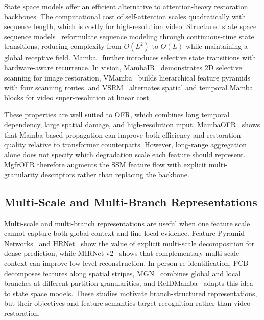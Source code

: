 \documentclass[symmetry,article,submit,pdftex,moreauthors]{Definitions/mdpi}
\begin{document}
State space models offer an efficient alternative to attention-heavy restoration backbones. The computational cost of self-attention scales quadratically with sequence length, which is costly for high-resolution video. Structured state space sequence models~\cite{gu2022s4} reformulate sequence modeling through continuous-time state transitions, reducing complexity from $O(L^2)$ to $O(L)$ while maintaining a global receptive field. Mamba~\cite{gu2024mamba} further introduces selective state transitions with hardware-aware recurrence. In vision, MambaIR~\cite{guo2024mambair} demonstrates 2D selective scanning for image restoration, VMamba~\cite{liu2024vmamba} builds hierarchical feature pyramids with four scanning routes, and VSRM~\cite{tran2025vsrm} alternates spatial and temporal Mamba blocks for video super-resolution at linear cost.

These properties are well suited to OFR, which combines long temporal dependency, large spatial damage, and high-resolution input. MambaOFR~\cite{mao2025mambaofr} shows that Mamba-based propagation can improve both efficiency and restoration quality relative to transformer counterparts. However, long-range aggregation alone does not specify which degradation scale each feature should represent. MgfrOFR therefore augments the SSM feature flow with explicit multi-granularity descriptors rather than replacing the backbone.

\subsection{Multi-Scale and Multi-Branch Representations}
\label{subsec:multigran}

Multi-scale and multi-branch representations are useful when one feature scale cannot capture both global context and fine local evidence. Feature Pyramid Networks~\cite{lin2017fpn} and HRNet~\cite{wang2021hrnet} show the value of explicit multi-scale decomposition for dense prediction, while MIRNet-v2~\cite{zamir2022mirnetv2} shows that complementary multi-scale context can improve low-level reconstruction. In person re-identification, PCB~\cite{sun2018pcb} decomposes features along spatial stripes, MGN~\cite{wang2018mgn} combines global and local branches at different partition granularities, and ReIDMamba~\cite{gu2025reidmamba} adapts this idea to state space models. These studies motivate branch-structured representations, but their objectives and feature semantics target recognition rather than video restoration.
\end{document}
